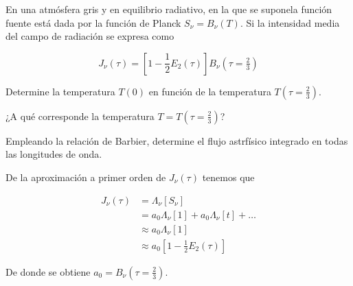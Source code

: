 \documentclass[10pt,spanish,a4paper]{practice}
\begin{document}
    \begin{problem}
        En una atmósfera gris y en equilibrio radiativo, en la que se suponela función fuente está dada por la función de Planck $S_\nu = B_\nu\left(T\right)$. Si la intensidad media del campo de radiación se expresa como

        $$
            J_{\nu}\left(\tau\right) = \left[1 - \frac{1}{2}E_{2}\left(\tau\right)\right]B_{\nu}\left(\tau=\tfrac{2}{3}\right)
        $$

        \begin{ppart}
            Determine la temperatura $T(0)$ en función de la temperatura $T(\tau=\frac{2}{3})$.
        \end{ppart}

        \begin{ppart}
            ¿A qué corresponde la temperatura $T = T(\tau=\frac{2}{3})$?
        \end{ppart}

        \begin{ppart}
            Empleando la relación de Barbier, determine el flujo astrfísico integrado en todas las longitudes de onda.
        \end{ppart}

        \begin{solution}{}
            \begin{spart}
                De la aproximación a primer orden de $J_\nu\left(\tau\right)$ tenemos que

                \begin{align*}
                    J_\nu\left(\tau\right) &= \Lambda_\nu\left[S_\nu\right] \\
                    &= a_{0}\Lambda_\nu\left[1\right] + a_{0}\Lambda_\nu\left[t\right] + \ldots \\
                    &\approx a_{0}\Lambda_\nu\left[1\right] \\
                    &\approx a_{0}\left[1 - \frac{1}{2}E_2\left(\tau\right)\right]
                \end{align*}

                De donde se obtiene $a_0 = B_{\nu}\left(\tau=\frac{2}{3}\right)$.

            \end{spart}
        \end{solution}
    \end{problem}
\end{document}
